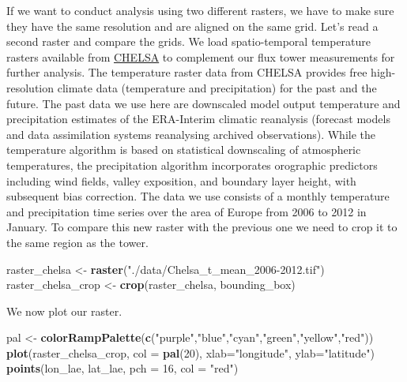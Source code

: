 \documentclass[
]{book}
\newenvironment{Shaded}{\begin{snugshade}}{\end{snugshade}}
\newcommand{\DataTypeTok}[1]{\textcolor[rgb]{0.13,0.29,0.53}{#1}}
\newcommand{\DecValTok}[1]{\textcolor[rgb]{0.00,0.00,0.81}{#1}}
\newcommand{\KeywordTok}[1]{\textcolor[rgb]{0.13,0.29,0.53}{\textbf{#1}}}
\newcommand{\NormalTok}[1]{#1}
\newcommand{\StringTok}[1]{\textcolor[rgb]{0.31,0.60,0.02}{#1}}
\begin{document}
If we want to conduct analysis using two different rasters, we have to make sure they have the same resolution and are aligned on the same grid. Let's read a second raster and compare the grids. We load spatio-temporal temperature rasters available from \href{https://chelsa-climate.org}{CHELSA} to complement our flux tower measurements for further analysis.
The temperature raster data from CHELSA provides free high-resolution climate data (temperature and precipitation) for the past and the future. The past data we use here are downscaled model output temperature and precipitation estimates of the ERA-Interim climatic reanalysis (forecast models and data assimilation systems reanalysing archived observations). While the temperature algorithm is based on statistical downscaling of atmospheric temperatures, the precipitation algorithm incorporates orographic predictors including wind fields, valley exposition, and boundary layer height, with subsequent bias correction. The data we use consists of a monthly temperature and precipitation time series over the area of Europe from 2006 to 2012 in January. To compare this new raster with the previous one we need to crop it to the same region as the tower.

\begin{Shaded}
\begin{Highlighting}[]
\NormalTok{raster_chelsa <-}\StringTok{ }\KeywordTok{raster}\NormalTok{(}\StringTok{"./data/Chelsa_t_mean_2006-2012.tif"}\NormalTok{)}
\NormalTok{raster_chelsa_crop <-}\StringTok{ }\KeywordTok{crop}\NormalTok{(raster_chelsa, bounding_box)}
\end{Highlighting}
\end{Shaded}

We now plot our raster.

\begin{Shaded}
\begin{Highlighting}[]
\NormalTok{pal <-}\StringTok{ }\KeywordTok{colorRampPalette}\NormalTok{(}\KeywordTok{c}\NormalTok{(}\StringTok{"purple"}\NormalTok{,}\StringTok{"blue"}\NormalTok{,}\StringTok{"cyan"}\NormalTok{,}\StringTok{"green"}\NormalTok{,}\StringTok{"yellow"}\NormalTok{,}\StringTok{"red"}\NormalTok{))}
\KeywordTok{plot}\NormalTok{(raster_chelsa_crop, }\DataTypeTok{col =} \KeywordTok{pal}\NormalTok{(}\DecValTok{20}\NormalTok{), }\DataTypeTok{xlab=}\StringTok{"longitude"}\NormalTok{, }\DataTypeTok{ylab=}\StringTok{"latitude"}\NormalTok{)}
\KeywordTok{points}\NormalTok{(lon_lae, lat_lae, }\DataTypeTok{pch =} \DecValTok{16}\NormalTok{, }\DataTypeTok{col =} \StringTok{"red"}\NormalTok{)}
\end{Highlighting}
\end{Shaded}
\end{document}
